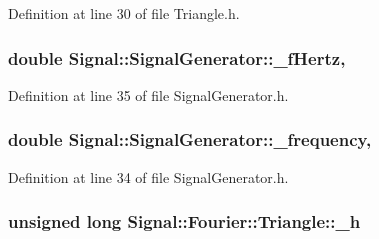 Definition at line 30 of file Triangle.\+h.

\hypertarget{classSignal_1_1SignalGenerator_a85a4702347352bab1c71e0a8df8437d6}{
\subsubsection[{\+\_\+f\+Hertz}]{\setlength{\rightskip}{0pt plus 5cm}double Signal\+::\+Signal\+Generator\+::\+\_\+f\+Hertz\hspace{0.3cm}{\ttfamily [protected]}, {\ttfamily [inherited]}}}\label{classSignal_1_1SignalGenerator_a85a4702347352bab1c71e0a8df8437d6}


Definition at line 35 of file Signal\+Generator.\+h.

\hypertarget{classSignal_1_1SignalGenerator_a7f107461333bce68c5dad412db96a8c2}{
\subsubsection[{\+\_\+frequency}]{\setlength{\rightskip}{0pt plus 5cm}double Signal\+::\+Signal\+Generator\+::\+\_\+frequency\hspace{0.3cm}{\ttfamily [protected]}, {\ttfamily [inherited]}}}\label{classSignal_1_1SignalGenerator_a7f107461333bce68c5dad412db96a8c2}


Definition at line 34 of file Signal\+Generator.\+h.

\hypertarget{classSignal_1_1Fourier_1_1Triangle_a0d987dff01447373147446f729357df0}{
\subsubsection[{\+\_\+h}]{\setlength{\rightskip}{0pt plus 5cm}unsigned long Signal\+::\+Fourier\+::\+Triangle\+::\+\_\+h\hspace{0.3cm}{\ttfamily [protected]}}}\label{classSignal_1_1Fourier_1_1Triangle_a0d987dff01447373147446f729357df0}


